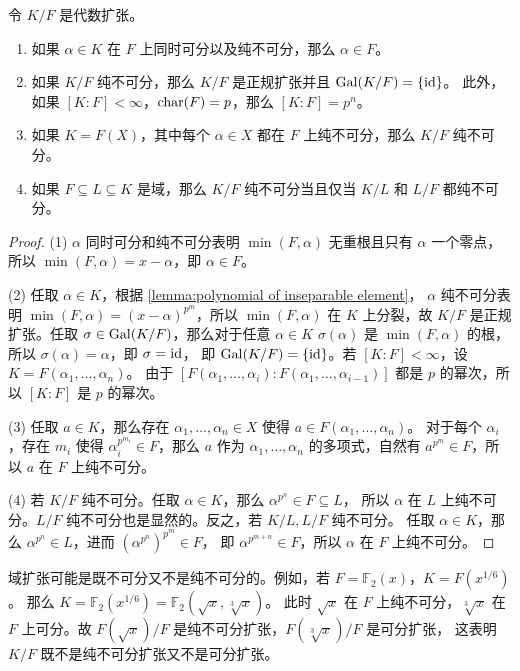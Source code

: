 \begin{lemma}\label{lemma:property of purely inseparable}
  令 $K/F$ 是代数扩张。
  \begin{enumerate}
    \item 如果 $\alpha\in K$ 在 $F$ 上同时可分以及纯不可分，那么 $\alpha\in F$。
    \item 如果 $K/F$ 纯不可分，那么 $K/F$ 是正规扩张并且 $\operatorname{Gal}(K/F)=\{\operatorname{id}\}$。
    此外，如果 $[K:F]<\infty$，$\operatorname{char}(F)=p$，那么 $[K:F]=p^n$。
    \item 如果 $K=F(X)$，其中每个 $\alpha\in X$ 都在 $F$ 上纯不可分，那么 $K/F$
    纯不可分。
    \item 如果 $F\subseteq L\subseteq K$ 是域，那么 $K/F$ 纯不可分当且仅当 $K/L$ 和
    $L/F$ 都纯不可分。
  \end{enumerate}
\end{lemma}
\begin{proof}
  (1) $\alpha$ 同时可分和纯不可分表明 $\min(F,\alpha)$ 无重根且只有 $\alpha$ 一个零点，所以
  $\min(F,\alpha)=x-\alpha$，即 $\alpha\in F$。

  (2) 任取 $\alpha\in K$，根据 \autoref{lemma:polynomial of inseparable element}，
  $\alpha$ 纯不可分表明 $\min(F,\alpha)=(x-\alpha)^{p^m}$，所以 $\min(F,\alpha)$
  在 $K$ 上分裂，故 $K/F$ 是正规扩张。任取 $\sigma\in\operatorname{Gal}(K/F)$，那么对于任意 $\alpha\in K$
  $\sigma(\alpha)$ 是 $\min(F,\alpha)$ 的根，所以 $\sigma(\alpha)=\alpha$，即 $\sigma=\operatorname{id}$，
  即 $\operatorname{Gal}(K/F)=\{\operatorname{id}\}$。若 $[K:F]<\infty$，设 $K=F(\alpha_1,\dots,\alpha_n)$。
  由于 $[F(\alpha_1,\dots,\alpha_i):F(\alpha_1,\dots,\alpha_{i-1})]$
  都是 $p$ 的幂次，所以 $[K:F]$ 是 $p$ 的幂次。

  (3) 任取 $a\in K$，那么存在 $\alpha_1,\dots,\alpha_n\in X$ 使得 $a\in F(\alpha_1,\dots,\alpha_n)$。
  对于每个 $\alpha_i$，存在 $m_i$ 使得 $\alpha_i^{p^{m_i}}\in F$，那么 $a$ 作为 $\alpha_1,\dots,\alpha_n$
  的多项式，自然有 $a^{p^m}\in F$，所以 $a$ 在 $F$ 上纯不可分。

  (4) 若 $K/F$ 纯不可分。任取 $\alpha\in K$，那么 $\alpha^{p^n}\in F\subseteq L$，
  所以 $\alpha$ 在 $L$ 上纯不可分。$L/F$ 纯不可分也是显然的。反之，若 $K/L,L/F$ 纯不可分。
  任取 $\alpha\in K$，那么 $\alpha^{p^n}\in L$，进而 $(\alpha^{p^n})^{p^m}\in F$，
  即 $\alpha^{p^{m+n}}\in F$，所以 $\alpha$ 在 $F$ 上纯不可分。
\end{proof}

\begin{example}
  域扩张可能是既不可分又不是纯不可分的。例如，若 $F=\mathbb{F}_2(x)$，$K=F(x^{1/6})$。
  那么 $K=\mathbb{F}_2(x^{1/6})=\mathbb{F}_2(\sqrt{x},\sqrt[3]{x})$。
  此时 $\sqrt{x}$ 在 $F$ 上纯不可分，$\sqrt[3]{x}$ 在 $F$ 上可分。故
  $F(\sqrt{x})/F$ 是纯不可分扩张，$F(\sqrt[3]{x})/F$ 是可分扩张，
  这表明 $K/F$ 既不是纯不可分扩张又不是可分扩张。
\end{example}

